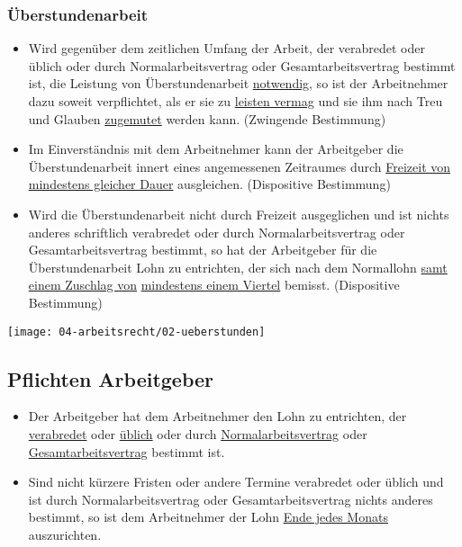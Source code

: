 \subsubsection{Überstundenarbeit}
\begin{itemize}
    \item Wird gegenüber dem zeitlichen Umfang der Arbeit, der verabredet oder üblich oder durch Normalarbeitsvertrag oder Gesamtarbeitsvertrag bestimmt ist, die Leistung von Überstundenarbeit \underline{notwendig}, so ist der Arbeitnehmer dazu soweit verpflichtet, als er sie zu \underline{leisten vermag} und sie ihm nach Treu und Glauben \underline{zugemutet} werden kann. (Zwingende Bestimmung)
    \item Im Einverständnis mit dem Arbeitnehmer kann der Arbeitgeber die Überstundenarbeit innert eines angemessenen Zeitraumes durch \underline{Freizeit von mindestens gleicher Dauer} ausgleichen. (Dispositive Bestimmung)
    \item Wird die Überstundenarbeit nicht durch Freizeit ausgeglichen und ist nichts anderes schriftlich verabredet oder durch Normalarbeitsvertrag oder Gesamtarbeitsvertrag bestimmt, so hat der Arbeitgeber für die Überstundenarbeit Lohn zu entrichten, der sich nach dem Normallohn \underline{samt einem Zuschlag von} \underline{mindestens einem Viertel} bemisst. (Dispositive Bestimmung)
\end{itemize}

\begin{center}
    \texttt{[image: 04-arbeitsrecht/02-ueberstunden]}
\end{center}

\subsection{Pflichten Arbeitgeber}
\begin{itemize}
    \item Der Arbeitgeber hat dem Arbeitnehmer den Lohn zu entrichten, der \underline{verabredet} oder \underline{üblich} oder durch \underline{Normalarbeitsvertrag} oder \underline{Gesamtarbeitsvertrag} bestimmt ist.
    \item Sind nicht kürzere Fristen oder andere Termine verabredet oder üblich und ist durch Normalarbeitsvertrag oder Gesamtarbeitsvertrag nichts anderes bestimmt, so ist dem Arbeitnehmer der Lohn \underline{Ende jedes Monats} auszurichten.
\end{itemize}

